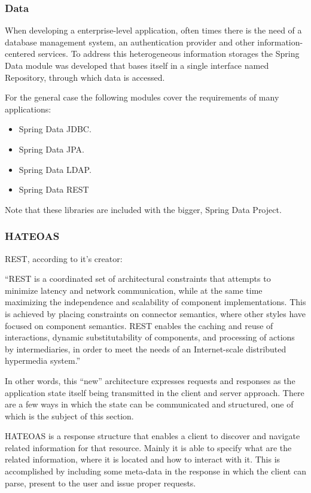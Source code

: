 \subsubsection{Data}
When developing a enterprise-level application, often times there is the need of a database management system, an authentication provider and other information-centered services. To address this heterogeneous information storages the Spring Data module was developed that bases itself in a single interface named Repository, through which data is accessed\cite{springdata}.

For the general case the following modules cover the requirements of many applications:
\begin{itemize}
\item Spring Data \gls{JDBC}.
\item Spring Data \gls{JPA}.
\item Spring Data \gls{LDAP}.
\item Spring Data \gls{REST}
\end{itemize}
Note that these libraries are included with the bigger, Spring Data Project.

\subsubsection{\gls{HATEOAS}}
\gls{REST}, according to it's creator:

\begin{displayquote}
  ``REST is a coordinated set of architectural constraints that attempts to minimize latency and network communication, while at the same time maximizing the independence and scalability of component implementations. This is achieved  by  placing  constraints  on  connector  semantics,  where  other  styles have focused on component semantics. REST enables the caching and reuse of interactions, dynamic substitutability of components, and processing of actions by intermediaries, in order to meet the needs of an Internet-scale distributed hypermedia system.''~\cite{fielding}
\end{displayquote}

In other words, this ``new'' architecture expresses requests and responses as the application state itself being transmitted in the client and server approach. There are a few ways in which the state can be communicated and structured, one of which is the subject of this section. 

\gls{HATEOAS} is a response structure that enables a client to discover and navigate related information for that resource\cite{fielding}. Mainly it is able to specify what are the related information, where it is located and how to interact with it. This is accomplished by including some meta-data in the response in which the client can parse, present to the user and issue proper requests.

